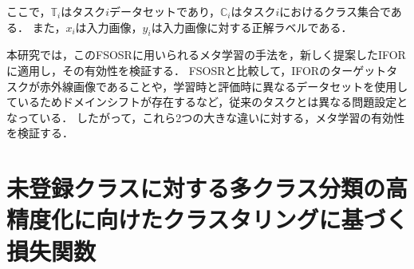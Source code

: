 \documentclass[a4paper,11pt,nomag]{jsreport}
\begin{document}
\noindent
ここで，$\mathbb{T}_i$はタスク$i$データセットであり，$\mathbb{C}_i$はタスク$i$におけるクラス集合である．
また，$x_i$は入力画像，$y_i$は入力画像に対する正解ラベルである．

本研究では，このFSOSRに用いられるメタ学習の手法を，新しく提案したIFORに適用し，その有効性を検証する．
FSOSRと比較して，IFORのターゲットタスクが赤外線画像であることや，学習時と評価時に異なるデータセットを使用しているためドメインシフトが存在するなど，従来のタスクとは異なる問題設定となっている．
したがって，これら2つの大きな違いに対する，メタ学習の有効性を検証する．

\section{未登録クラスに対する多クラス分類の高精度化に向けたクラスタリングに基づく損失関数}
\end{document}
